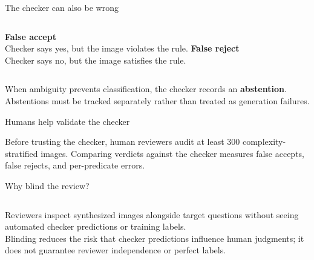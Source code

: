 \documentclass[aspectratio=169,11pt]{beamer}
\begin{document}
\begin{frame}{The checker can also be wrong}
\begin{columns}[T]
\textbf{False accept}\\Checker says yes, but the image violates the rule.
\textbf{False reject}\\Checker says no, but the image satisfies the rule.
\end{columns}
\vspace{4mm}
\normalsize When ambiguity prevents classification, the checker records an \textbf{abstention}. Abstentions must be tracked separately rather than treated as generation failures.
\end{frame}

\begin{frame}{Humans help validate the checker}
\begin{center}\end{center}
\vspace{2mm}
\normalsize Before trusting the checker, human reviewers audit at least 300 complexity-stratified images. Comparing verdicts against the checker measures false accepts, false rejects, and per-predicate errors.
\end{frame}

\begin{frame}{Why blind the review?}
\begin{columns}[T]
\normalsize Reviewers inspect synthesized images alongside target questions without seeing automated checker predictions or training labels.
\vspace{3mm}\\
\normalsize Blinding reduces the risk that checker predictions influence human judgments; it does not guarantee reviewer independence or perfect labels.
\end{columns}
\end{frame}
\end{document}
